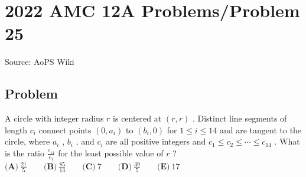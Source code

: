\documentclass[12pt]{article}
\begin{document}
\section*{{2022 AMC 12A Problems/Problem 25}}
Source: AoPS Wiki

\subsection*{Problem}
A circle with integer radius $r$ is centered at $(r, r)$ . Distinct line segments of length $c_i$ connect points $(0, a_i)$ to $(b_i, 0)$ for $1 \le i \le 14$ and are tangent to the circle, where $a_i$ , $b_i$ , and $c_i$ are all positive integers and $c_1 \le c_2 \le \cdots \le c_{14}$ . What is the ratio $\frac{c_{14}}{c_1}$ for the least possible value of $r$ ? $\textbf{(A)} ~\frac{21}{5} \qquad\textbf{(B)} ~\frac{85}{13} \qquad\textbf{(C)} ~7 \qquad\textbf{(D)} ~\frac{39}{5} \qquad\textbf{(E)} ~17$
\end{document}
